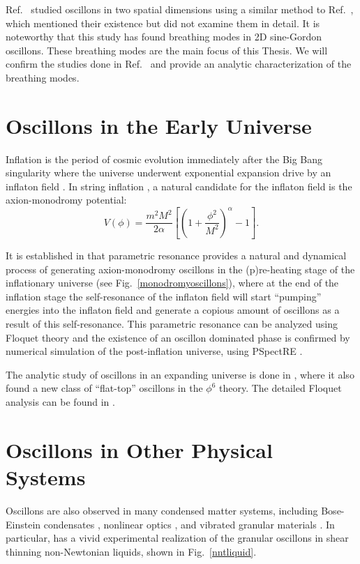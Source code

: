 \documentclass[11pt]{book}
\begin{document}
Ref.~\cite{Hindmarsh:2006ur} studied oscillons in two spatial dimensions using a similar method to Ref.~\cite{Salmi:2012ta}, which mentioned their existence but did not examine them in detail. It is noteworthy that this study has found breathing modes in 2D sine-Gordon oscillons. These breathing modes are the main focus of this Thesis. We will confirm the studies done in Ref.~\cite{Hindmarsh:2006ur} and provide an analytic characterization of the breathing modes.

\section{Oscillons in the Early Universe}\label{litrev:cosmo}
Inflation is the period of cosmic evolution immediately after the Big Bang singularity where the universe underwent exponential expansion drive by an inflaton field \cite{mukhanov2005physical}. In string inflation \cite{stringInflationBook, McAllister:2008hb, Silverstein:2008sg, Flauger:2009ab}, a natural candidate for the inflaton field is the axion-monodromy potential:
\begin{equation}\label{fullampot}
  V(\phi) = \frac{m^2M^2}{2\alpha} \left[\left(1+\frac{\phi^2}{M^2}\right)^\alpha -1\right].
\end{equation}

It is established in \cite{Amin:2010dc, Amin:2011hj} that parametric resonance provides a natural and dynamical process of generating axion-monodromy oscillons in the (p)re-heating stage of the inflationary universe (see Fig.~\ref{monodromyoscillons}), where at the end of the inflation stage the self-resonance of the inflaton field will start ``pumping'' energies into the inflaton field and generate a copious amount of oscillons as a result of this self-resonance. This parametric resonance can be analyzed using Floquet theory and the existence of an oscillon dominated phase is confirmed by numerical simulation of the post-inflation universe, using PSpectRE \cite{Easther:2010qz}.

The analytic study of oscillons in an expanding universe is done in \cite{Amin:2010jq}, where it also found a new class of ``flat-top'' oscillons in the $\phi^6$ theory. The detailed Floquet analysis can be found in \cite{Amin:2010dc}.

\section{Oscillons in Other Physical Systems}\label{litrev:phymisc}
Oscillons are also observed in many condensed matter systems, including Bose-Einstein condensates \cite{umbanhowar1996localized}, nonlinear optics \cite{Copeland:2014qra}, and vibrated granular materials \cite{Tsimring:1997zz, PhysRevLett.83.3190}. In particular, \cite{PhysRevLett.83.3190} has a vivid experimental realization of the granular oscillons in shear thinning non-Newtonian liquids, shown in Fig.~\ref{nntliquid}.
\end{document}
